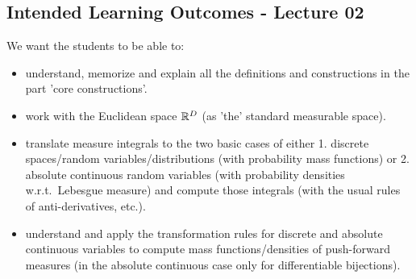 \subsection*{Intended Learning Outcomes - Lecture 02}

We want the students to be able to:
\begin{itemize}
\item understand, memorize and explain all the definitions and constructions in the part 'core constructions'.
\item work with the Euclidean space $\mathbb{R}^D$ (as 'the' standard measurable space).
\item translate measure integrals to the two basic cases of either 1. discrete spaces/random variables/distributions (with probability mass functions) or 2. absolute continuous random variables (with probability densities w.r.t.\ Lebesgue measure) and compute those integrals (with the usual rules of anti-derivatives, etc.).
\item understand and apply the transformation rules for discrete and absolute continuous variables to compute mass functions/densities of push-forward measures (in the absolute continuous case only for differentiable bijections).
\end{itemize}
